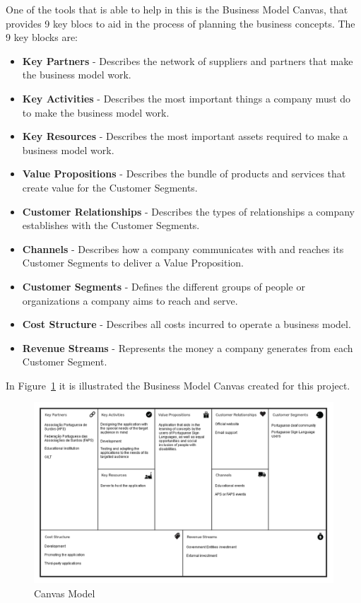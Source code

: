 One of the tools that is able to help in this is the Business Model Canvas\cite{osterwalder2010business}, that provides 9 key blocs to aid in the process of planning the business concepts.
The 9 key blocks are:

\begin{itemize}
    \item \textbf{Key Partners} - Describes the network of suppliers and partners that make the business model work.
    \item \textbf{Key Activities} - Describes the most important things a company must do to make the business model work.
    \item \textbf{Key Resources} - Describes the most important assets required to make a business model work.
    \item \textbf{Value Propositions} - Describes the bundle of products and services that create value for the Customer Segments.
    \item \textbf{Customer Relationships} - Describes the types of relationships a company establishes with the Customer Segments.
    \item \textbf{Channels} - Describes how a company communicates with and reaches its Customer Segments to deliver a Value Proposition.
    \item \textbf{Customer Segments} - Defines the different groups of people or organizations a company aims to reach and serve.
    \item \textbf{Cost Structure} - Describes all costs incurred to operate a business model.
    \item \textbf{Revenue Streams} - Represents the money a company generates from each Customer Segment.
\end{itemize}

In Figure~\ref{fig:CANVAS} it is illustrated the Business Model Canvas created for this project.

\begin{figure}[H]
\centering
\includegraphics[width=\textwidth,keepaspectratio]{ch3/assets/CANVAS.png}
\caption[Canvas Model]{Canvas Model}
\label{fig:CANVAS}
\end{figure}

